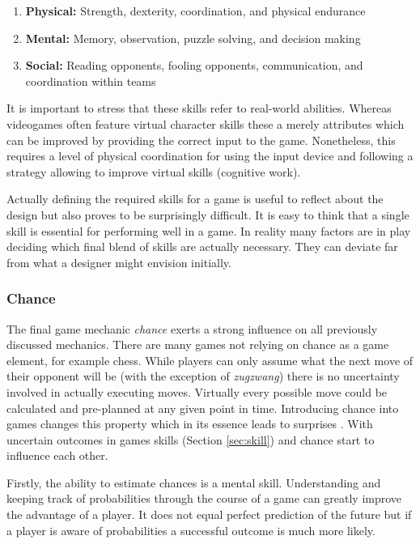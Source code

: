 \begin{enumerate}
    \item \textbf{Physical:} Strength, dexterity, coordination, and physical endurance
    \item \textbf{Mental:} Memory, observation, puzzle solving, and decision making
    \item \textbf{Social:} Reading opponents, fooling opponents, communication, and coordination within teams
\end{enumerate}

It is important to stress that these skills refer to real-world abilities.
Whereas videogames often feature virtual character skills these a merely attributes which can be improved by providing the correct input to the game.
Nonetheless, this requires a level of physical coordination for using the input device and following a strategy allowing to improve virtual skills (cognitive work).

Actually defining the required skills for a game is useful to reflect about the design but also proves to be surprisingly difficult.
It is easy to think that a single skill is essential for performing well in a game.
In reality many factors are in play deciding which final blend of skills are actually necessary.
They can deviate far from what a designer might envision initially.

\subsubsection{Chance}
The final game mechanic \textit{chance} exerts a strong influence on all previously discussed mechanics.
There are many games not relying on chance as a game element, for example chess.
While players can only assume what the next move of their opponent will be (with the exception of \textit{zugzwang}) there is no uncertainty involved in actually executing moves.
Virtually every possible move could be calculated and pre-planned at any given point in time.
Introducing chance into games changes this property which in its essence leads to surprises \cite{Schell2014}.
With uncertain outcomes in games skills (Section \ref{sec:skill}) and chance start to influence each other.

Firstly, the ability to estimate chances is a mental skill.
Understanding and keeping track of probabilities through the course of a game can greatly improve the advantage of a player.
It does not equal perfect prediction of the future but if a player is aware of probabilities a successful outcome is much more likely.

